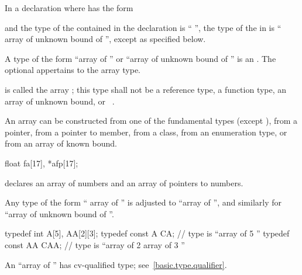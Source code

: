 \pnum
In a declaration   where  has the form
\begin{ncsimplebnf}
 
\end{ncsimplebnf}
and the type of the contained 
in the declaration  
is `` '',
the type of the  in  is
`` array of unknown bound of '', except as specified below.

\pnum
{}%
A type of the form ``array of  '' or
``array of unknown bound of '' is an .
The optional 
appertains to the array type.

\pnum
{} is called the array ;
this type shall not be
a reference type,
a function type,
an array of unknown bound, or
\cv{}~.
\begin{note}
An array can be constructed
from one of the fundamental types (except ),
from a pointer,
from a pointer to member,
from a class,
from an enumeration type,
or from an array of known bound.
\end{note}
\begin{example}
\begin{codeblock}
float fa[17], *afp[17];
\end{codeblock}
declares an array of  numbers and
an array of pointers to  numbers.
\end{example}

\pnum
Any type of the form
`` array of  ''
is adjusted to
``array of   '',
and similarly for ``array of unknown bound of ''.
\begin{example}
\begin{codeblock}
typedef int A[5], AA[2][3];
typedef const A CA;             // type is ``array of 5 ''
typedef const AA CAA;           // type is ``array of 2 array of 3 ''
\end{codeblock}
\end{example}
\begin{note}
An ``array of   ''
has cv-qualified type; see~\ref{basic.type.qualifier}.
\end{note}

